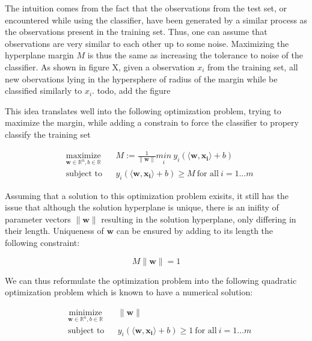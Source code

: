 The intuition comes from the fact that the observations from the test set, or encountered while using the classifier, have been generated by a similar process as the observations present in the training set. Thus, one can assume that observations are very similar to each other up to some noise. Maximizing the hyperplane margin
$M$ is thus the same as increasing the tolerance to noise of the classifier. As shown in figure X, given a observation $x_i$ from the training set, all new obervations lying in the hypersphere of radius of the margin while be classified similarly to $x_i$.  \textcolor[rgb]{1,0,0}{todo, add the figure}


This idea translates well into the following optimization problem, trying to maximize the margin, while adding a constrain to force the classifier to propery classify the training set

\begin{equation}
  \begin{aligned}
    &\underset{\mathbf{w} \in \mathbb{R}^n, b \in \mathbb{R}} {\text{maximize}}
    & & M := \frac{1}{\|\mathbf{w}\|} \underset{i} {min}\ 
    y_i(\langle\mathbf{w},\mathbf{x_i}\rangle + b)\\
    &\text{subject to}
    & &y_i(\langle\mathbf{w},\mathbf{x_i}\rangle + b) \ge M\ \text{for all}\ i = 1 \dotsc m
  \end{aligned}
\end{equation}

Assuming that a solution to this optimization problem exisits, it still has the issue that although the solution hyperplane is unique, there is an inifity of parameter vectors $\|\mathbf{w}\|$ resulting in the solution hyperplane, only differing in their length. Uniqueness of $\mathbf{w}$ can be ensured by adding to its length the following constraint:

$$M\|\mathbf{w}\| = 1$$

We can thus reformulate the optimization problem into the following quadratic optimization problem which is known to have a numerical solution:

\begin{equation}
  \begin{aligned}
    &\underset{\mathbf{w} \in \mathbb{R}^n, b \in \mathbb{R}} {\text{minimize}}
    & &\|\mathbf{w}\|\\
    &\text{subject to}
    & &y_i(\langle\mathbf{w},\mathbf{x_i}\rangle + b) \ge 1\ \text{for all}\ i = 1 \dotsc m
  \end{aligned}
\end{equation}

